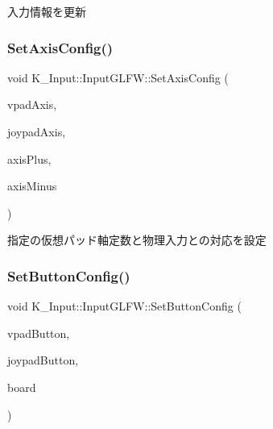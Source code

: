 入力情報を更新 

\mbox{\label{class_k___input_1_1_input_g_l_f_w_aa396c3e7ebc8dc6cad834a8caa36d549}} 
\subsubsection{\texorpdfstring{Set\+Axis\+Config()}{SetAxisConfig()}}
{\footnotesize\ttfamily void K\+\_\+\+Input\+::\+Input\+G\+L\+F\+W\+::\+Set\+Axis\+Config (\begin{DoxyParamCaption}\item[{\mbox{\hyperlink{namespace_k___input_ae7980bb169b8a865a5e67d6fe06fb729}{Vpad\+Axis}}}]{vpad\+Axis,  }\item[{\mbox{\hyperlink{namespace_k___input_a82230ae06723a21cc710ae3d66fd078f}{Joy\+Axis}}}]{joypad\+Axis,  }\item[{\mbox{\hyperlink{namespace_k___input_af62d80c77b12db01035e4b9aa27a09d6}{Key}}}]{axis\+Plus,  }\item[{\mbox{\hyperlink{namespace_k___input_af62d80c77b12db01035e4b9aa27a09d6}{Key}}}]{axis\+Minus }\end{DoxyParamCaption})}



指定の仮想パッド軸定数と物理入力との対応を設定 

\mbox{\label{class_k___input_1_1_input_g_l_f_w_aee6c383e0cdcf0f6eb8d3f51c0a4829f}} 
\subsubsection{\texorpdfstring{Set\+Button\+Config()}{SetButtonConfig()}}
{\footnotesize\ttfamily void K\+\_\+\+Input\+::\+Input\+G\+L\+F\+W\+::\+Set\+Button\+Config (\begin{DoxyParamCaption}\item[{\mbox{\hyperlink{namespace_k___input_ab1b3c957b1b7070e86ccd1a908f3a101}{Vpad\+Button}}}]{vpad\+Button,  }\item[{\mbox{\hyperlink{namespace_k___input_a0fad93a64181d6776849d43118c26902}{Joy\+Button}}}]{joypad\+Button,  }\item[{\mbox{\hyperlink{namespace_k___input_af62d80c77b12db01035e4b9aa27a09d6}{Key}}}]{board }\end{DoxyParamCaption})}



